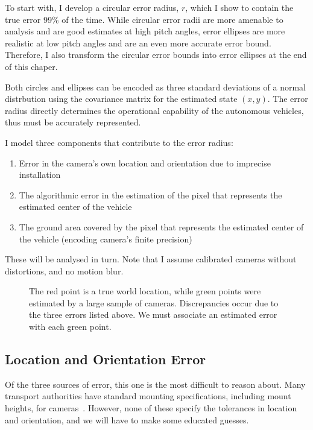 \documentclass[a4paper,12pt,twoside,openright]{report}
\begin{document}
To start with, I develop a circular error radius, $r$, which I show to contain
the true error 99\% of the time. While circular error radii are more amenable to analysis and are good
estimates at high pitch angles, error ellipses are more realistic at low pitch angles and are an 
even more accurate error bound. Therefore, I also transform the circular error bounds into error ellipses at the end of this chaper.

Both circles and ellipses can be encoded as three standard deviations of a normal distrbution
using the covariance matrix for the estimated state $(x,y)$. The error radius directly determines
the operational capability of the autonomous vehicles, thus must be accurately represented.

I model three components that contribute to the error radius:
\begin{enumerate}
    \item Error in the camera's own location and orientation due to imprecise installation
    \item The algorithmic error in the estimation of the pixel that represents the estimated center of the vehicle
    \item The ground area covered by the pixel that represents the estimated center of the vehicle (encoding camera's finite precision)
\end{enumerate}
 
These will be analysed in turn. Note that I assume calibrated cameras without distortions, and no motion blur.


\begin{figure}[htb]
    \begin{center}
        
    \end{center}
    \caption[Example Predictions about a World Point]{The red point is a true world location, while green points were
    estimated by a large sample of cameras. Discrepancies occur due to the three errors listed above. We must associate an estimated error with each green point.}
    \label{fig:camera:dist}
\end{figure}



\subsection{Location and Orientation Error}

Of the three sources of error, this one is the most difficult to reason about. 
Many transport authorities have standard mounting specifications, including mount heights, for cameras~\cite{StreetscapeGuideance}.
However, none of these specify the tolerances in location and orientation, and we will have to make some educated guesses.
\end{document}
